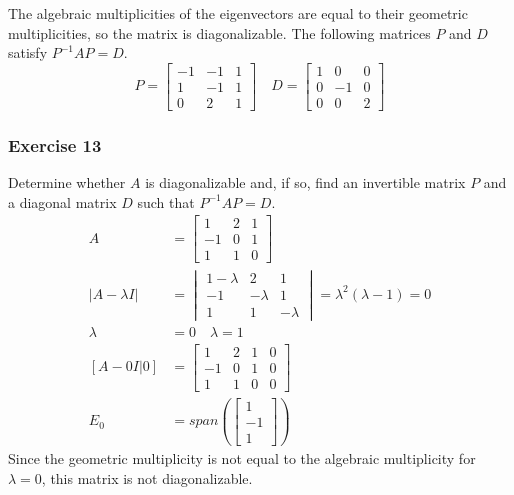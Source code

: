 \documentclass{math}
\begin{document}
The algebraic multiplicities of the eigenvectors are equal to their geometric
multiplicities, so the matrix is diagonalizable. The following matrices \( P \)
and \( D \) satisfy \( P^{-1}AP = D \).
\[ P = \begin{bmatrix}
    -1 & -1 & 1 \\
    1 & -1 & 1 \\
    0 & 2 & 1
  \end{bmatrix} \quad D = \begin{bmatrix}
    1 & 0 & 0 \\
    0 & -1 & 0 \\
    0 & 0 & 2
  \end{bmatrix} \]

\subsubsection*{Exercise 13}
Determine whether \( A \) is diagonalizable and, if so, find an invertible
matrix \( P \) and a diagonal matrix \( D \) such that \( P^{-1}AP = D \).
\begin{align*}
  A &= \begin{bmatrix}
    1 & 2 & 1 \\
    -1 & 0 & 1 \\
    1 & 1 & 0
  \end{bmatrix} \\
  |A-\lambda I| &= \begin{vmatrix}
    1-\lambda & 2 & 1 \\
    -1 & -\lambda & 1 \\
    1 & 1 & -\lambda
  \end{vmatrix} = \lambda^2(\lambda-1) = 0 \\
  \lambda &= 0 \quad \lambda = 1 \\
  [A-0I|0] &= \begin{bmatrix}
    1 & 2 & 1 & 0 \\
    -1 & 0 & 1 & 0\\
    1 & 1 & 0 & 0
  \end{bmatrix} \\
  E_0 &= span\left(\begin{bmatrix}1 \\ -1 \\ 1\end{bmatrix}\right)
\end{align*}
Since the geometric multiplicity is not equal to the algebraic multiplicity for
\( \lambda = 0 \), this matrix is not diagonalizable.
\end{document}
